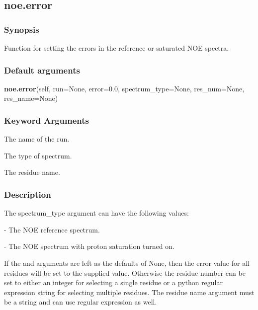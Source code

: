 




\newpage

\subsection{noe.error}


\subsubsection{Synopsis}

Function for setting the errors in the reference or saturated NOE spectra.

\subsubsection{Default arguments}

\textsf{\textbf{noe.error}(self, run=None, error=0.0, spectrum\_type=None, res\_num=None, res\_name=None)}


\subsubsection{Keyword Arguments}

  The name of the run.

  The type of spectrum.

  The residue name.

\subsubsection{Description}

The spectrum\_type argument can have the following values:
    
 - The NOE reference spectrum.
    
 - The NOE spectrum with proton saturation turned on.

If the 
 and 
 arguments are left as the defaults of None, then the error
value for all residues will be set to the supplied value.  Otherwise the residue number can
be set to either an integer for selecting a single residue or a python regular expression
string for selecting multiple residues.  The residue name argument must be a string and can
use regular expression as well.


